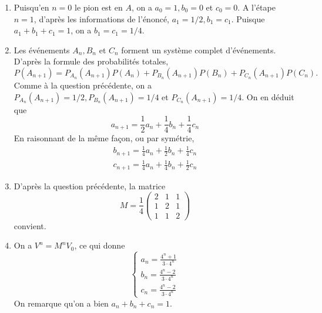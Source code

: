 \begin{correction}
\begin{enumerate}


\item  Puisqu'en $n=0$ le pion est en $A$, on a $a_{0}=1, b_{0}=0$ et $c_{0}=0 .$ A l'étape $n=1$, d'après les informations de l'énoncé, $a_{1}=1 / 2, b_{1}=c_{1}$. Puisque $a_{1}+b_{1}+c_{1}=1$, on a $b_{1}=c_{1}=1 / 4$.
\item  Les événements $A_{n}, B_{n}$ et $C_{n}$ forment un système complet d'événements. D'après la formule des probabilités totales,
$$
P\left(A_{n+1}\right)=P_{A_{n}}\left(A_{n+1}\right) P\left(A_{n}\right)+P_{B_{n}}\left(A_{n+1}\right) P\left(B_{n}\right)+P_{C_{n}}\left(A_{n+1}\right) P\left(C_{n}\right) .
$$
Comme à la question précédente, on a $P_{A_{n}}\left(A_{n+1}\right)=1 / 2, P_{B_{n}}\left(A_{n+1}\right)=1 / 4$ et $P_{C_{n}}\left(A_{n+1}\right)=1 / 4$. On en déduit que
$$
a_{n+1}=\frac{1}{2} a_{n}+\frac{1}{4} b_{n}+\frac{1}{4} c_{n}
$$
En raisonnant de la même façon, ou par symétrie,
$$
\begin{gathered}
b_{n+1}=\frac{1}{4} a_{n}+\frac{1}{2} b_{n}+\frac{1}{4} c_{n} \\
c_{n+1}=\frac{1}{4} a_{n}+\frac{1}{4} b_{n}+\frac{1}{2} c_{n}
\end{gathered}
$$
\item  D'après la question précédente, la matrice
$$
M=\frac{1}{4}\left(\begin{array}{lll}
2 & 1 & 1 \\
1 & 2 & 1 \\
1 & 1 & 2
\end{array}\right)
$$
convient.
\item  On a $V^{n}=M^{n} V_{0}$, ce qui donne
$$
\left\{\begin{array}{l}
a_{n}=\frac{4^{n}+1}{3 \cdot 4^{n}} \\
b_{n}=\frac{4^{n}-2}{3 \cdot 4^{n}} \\
c_{n}=\frac{4^{n}-2}{3 \cdot 4^{n}}
\end{array}\right.
$$
On remarque qu'on a bien $a_{n}+b_{n}+c_{n}=1$.
\end{enumerate}
\end{correction}
